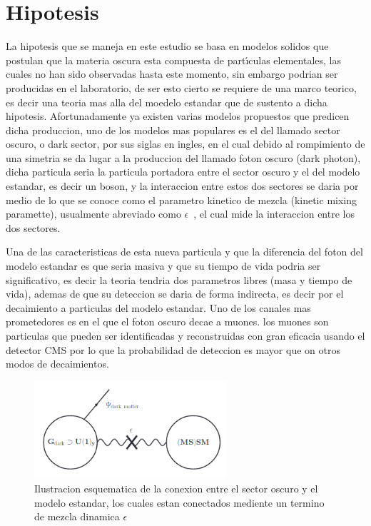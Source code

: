 \chapter{Hipotesis}

La hipotesis que se maneja en este estudio se basa en modelos solidos que postulan que la materia oscura esta compuesta de part\'{\i}culas elementales, las cuales no han sido observadas hasta este momento, sin embargo podrian ser producidas en el laboratorio, de ser esto cierto se requiere de una marco teorico, es decir una teoria mas alla del moedelo estandar que de sustento a dicha hipotesis. Afortunadamente ya existen varias modelos propuestos que predicen dicha produccion, uno de los modelos mas populares es el del llamado sector oscuro, o dark sector, por sus siglas en ingles, en el cual debido al rompimiento de una simetria se da lugar a la produccion del llamado foton oscuro (dark photon), dicha particula seria la particula portadora entre el sector oscuro y el del modelo estandar, es decir un boson, y la interaccion entre estos dos sectores se daria por medio de lo que se conoce como el parametro kinetico de mezcla (kinetic mixing paramette), usualmente abreviado como $\epsilon$~\cite{light_boson}, el cual mide la interaccion entre los dos sectores.

Una de las caracteristicas de esta nueva particula y que la diferencia del foton del modelo estandar es que seria masiva y que su tiempo de vida podria ser significativo, es decir la teoria tendria dos parametros libres (masa y tiempo de vida), ademas de que su deteccion se daria de forma indirecta, es decir por el decaimiento a particulas del modelo estandar.  Uno de los canales mas prometedores es en el que el foton oscuro decae a muones. los muones son particulas que pueden ser identificadas y reconstruidas con gran eficacia usando el detector CMS por lo que la probabilidad de deteccion es mayor que on otros modos de decaimientos.

\begin{figure}
\begin{center}
  \includegraphics[width=2.8in]{sketch_darksector.png}
  \caption{Ilustracion esquematica de la conexion entre el sector oscuro y el modelo estandar, los cuales estan conectados mediente un termino de mezcla dinamica $\epsilon$}
  \label{fig:AMS_positron}
\end{center}
\end{figure}


